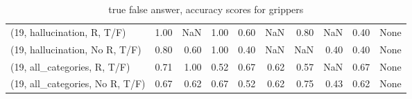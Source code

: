 \begin{table*}[h!]
\begin{adjustbox}{width=2\columnwidth,center}
\begin{tabular}{lrrr|rrr|rrr}
(19, hallucination, R, T/F)           &                      1.00 &                   NaN &                      1.00 &                          0.60 &                       NaN &                          0.80 &                                    NaN &                               0.40 &                                  None \\
(19, hallucination, No R, T/F)        &                      0.80 &                  0.60 &                      1.00 &                          0.40 &                       NaN &                           NaN &                                   0.40 &                               0.40 &                                  None \\
(19, all\_categories, R, T/F)          &                      0.71 &                  1.00 &                      0.52 &                          0.67 &                      0.62 &                          0.57 &                                    NaN &                               0.67 &                                  None \\
(19, all\_categories, No R, T/F)       &                      0.67 &                  0.62 &                      0.67 &                          0.52 &                      0.62 &                          0.75 &                                   0.43 &                               0.62 &                                  None \\


\bottomrule
\end{tabular}
\end{adjustbox}
\caption{true false answer, accuracy scores for grippers}
\end{table*}